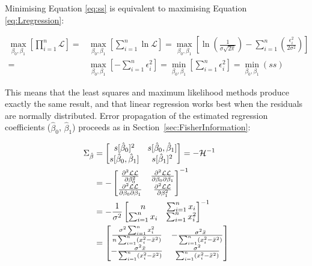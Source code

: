 Minimising Equation \ref{eq:ss} is equivalent to maximising Equation
\ref{eq:Lregression}:

\begin{equation}
\begin{split}
\underset{\beta_0,\beta_1}{\max}\left[\prod_{i=1}^n \mathcal{L}\right] = &
\underset{\beta_0,\beta_1}{\max}\left[\sum_{i=1}^n \ln\mathcal{L}\right] =
\underset{\beta_0,\beta_1}{\max}\left[\ln\!\left(\frac{1}{\sigma\sqrt{2\pi}}\right)-\sum_{i=1}^n\left(\frac{\epsilon_i^2}{2\sigma^2}\right)\right] \\
= & \underset{\beta_0,\beta_1}{\max}\left[-\sum_{i=1}^n\epsilon_i^2\right] = 
\underset{\beta_0,\beta_1}{\min}\left[\sum_{i=1}^{n} \epsilon_i^2\right] = \underset{\beta_0,\beta_1}{\min}(ss)
\end{split}
\end{equation}

This means that the least squares and maximum likelihood methods
produce exactly the same result, and that linear regression works best
when the residuals are normally distributed. Error propagation of the
estimated regression coefficients ($\hat{\beta}_0$, $\hat{\beta}_1$)
proceeds as in Section~\ref{sec:FisherInformation}:

\begin{equation}
  \begin{split}
    \Sigma_{\hat{\beta}} & = 
  \left[
    \begin{array}{@{}cc@{}}
      s[\hat{\beta}_0]^2 & s[\hat{\beta}_0,\hat{\beta}_1] \\
      s[\hat{\beta}_0,\hat{\beta}_1] & s[\hat{\beta}_1]^2 \\
    \end{array}
    \right] = 
  -\mathcal{H}^{-1} \\
  & =
    -\left[
      \begin{array}{@{}cc@{}}
        \frac{\partial^2{\mathcal{LL}}}{\partial{\beta_0^2}} &
        \frac{\partial^2{\mathcal{LL}}}{\partial{\beta_0}\partial{\beta_1}} \\
        \frac{\partial^2{\mathcal{LL}}}{\partial{\beta_0}\partial{\beta_1}} &
        \frac{\partial^2{\mathcal{LL}}}{\partial{\beta_1^2}}
      \end{array}
      \right]^{-1} \\
    & = -\frac{1}{\sigma^2}
    \left[
      \begin{array}{@{}cc@{}}
        n & \sum_{i=1}^{n}x_i \\
        \sum_{i=1}^{n}x_i & \sum_{i=1}^{n}x_i^2
      \end{array}
      \right]^{-1} \\
    & =
    \left[
      \begin{array}{@{}cc@{}}
        \frac{\sigma^2\sum_{i=1}^{n}x_i^2}{n\sum_{i=1}^{n}(x_i^2-\bar{x}^2)} &
        -\frac{\sigma^2\bar{x}}{\sum_{i=1}^{n}(x_i^2-\bar{x}^2)} \\
        -\frac{\sigma^2\bar{x}}{\sum_{i=1}^{n}(x_i^2-\bar{x}^2)} &
        \frac{\sigma^2}{\sum_{i=1}^{n}(x_i^2-\bar{x}^2)}
      \end{array}
      \right]
  \end{split}
  \label{eq:sigmabeta}
\end{equation}

